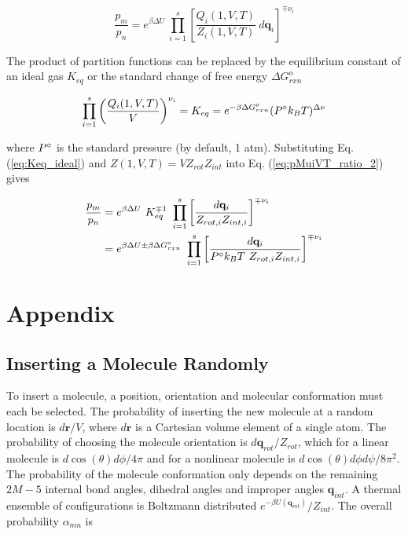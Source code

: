 \begin{equation}
\label{eq:pMuiVT_ratio_2}
\frac{p_m}{p_n} = e^{\beta \Delta U}\ \prod\limits_{i=1}^s\left[\frac{Q_i(1,V,T)}{Z_i(1,V,T)}\ d\mathbf{q}_i\right]^{\mp \nu_i}
\end{equation}

The product of partition functions can be replaced by the equilibrium constant of an ideal gas $K_{eq}$ or the standard change of free energy $\Delta G_{rxn}^o$

\begin{equation}
\label{eq:Keq_ideal}
\prod\limits_{i=1}^s{\left(\frac{Q_i(1,V,T)}{V}\right)^{\nu_i}} = K_{eq} = e^{-\beta \Delta G_{rxn}^o} (P\degree k_BT)^{\Delta \nu}
\end{equation}

where $P\degree$ is the standard pressure (by default, 1 atm). Substituting Eq. (\ref{eq:Keq_ideal}) and $Z(1,V,T) = VZ_{rot}Z_{int}$ into Eq. (\ref{eq:pMuiVT_ratio_2}) gives

\begin{align}
\label{eq:pMuiVT_ratio_3}
\frac{p_m}{p_n} &= e^{\beta \Delta U}\ K_{eq}^{\mp 1}\ \prod\limits_{i=1}^s\left[\frac{d\mathbf{q}_i}{Z_{rot,i}Z_{int,i}}\right]^{\mp \nu_i} \\
&= e^{\beta \Delta U \pm \beta \Delta G_{rxn}^o}\ \prod\limits_{i=1}^s\left[\frac{d\mathbf{q}_i}{P\degree k_BT\ Z_{rot,i}Z_{int,i}}\right]^{\mp \nu_i}
\end{align}

\section{Appendix}
\label{sec:appendix}
\subsection{Inserting a Molecule Randomly}
\label{sec:randomInsert}
To insert a molecule, a position, orientation and molecular conformation must each be selected. The probability of inserting the new molecule at a random location is $d\mathbf{r}/V$, where $d\mathbf{r}$ is a Cartesian volume element of a single atom. The probability of choosing the molecule orientation is $d\mathbf{q}_{rot}/Z_{rot}$, which for a linear molecule is $d \cos(\theta) d\phi / 4\pi$ and for a nonlinear molecule is $d \cos(\theta)d\phi d\psi/8\pi^2$. The probability of the molecule conformation only depends on the remaining $2M-5$ internal bond angles, dihedral angles and improper angles $\mathbf{q}_{int}$. A thermal ensemble of configurations is Boltzmann distributed $e^{-\beta U(\mathbf{q}_{int})}/Z_{int}$. The overall probability $\alpha_{mn}$ is

